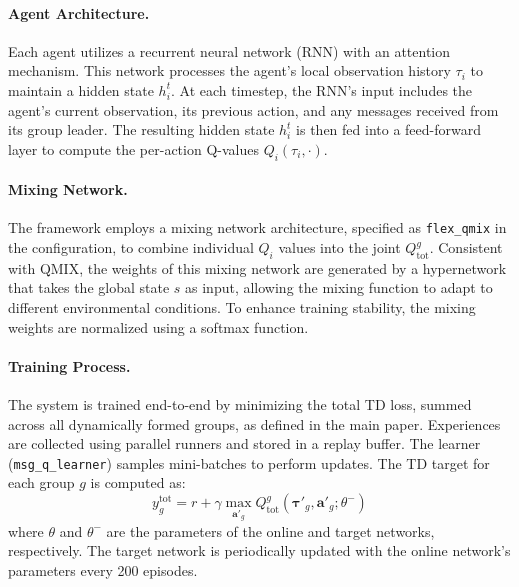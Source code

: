 \paragraph{Agent Architecture.} Each agent utilizes a recurrent neural network (RNN) with an attention mechanism. This network processes the agent's local observation history $\tau_i$ to maintain a hidden state $h_i^t$. At each timestep, the RNN's input includes the agent's current observation, its previous action, and any messages received from its group leader. The resulting hidden state $h_i^t$ is then fed into a feed-forward layer to compute the per-action Q-values $Q_i(\tau_i, \cdot)$.

\paragraph{Mixing Network.} The framework employs a mixing network architecture, specified as \texttt{flex\_qmix} in the configuration, to combine individual $Q_i$ values into the joint $Q_{\text{tot}}^g$. Consistent with QMIX, the weights of this mixing network are generated by a hypernetwork that takes the global state $s$ as input, allowing the mixing function to adapt to different environmental conditions. To enhance training stability, the mixing weights are normalized using a softmax function.

\paragraph{Training Process.} The system is trained end-to-end by minimizing the total TD loss, summed across all dynamically formed groups, as defined in the main paper. Experiences are collected using parallel runners and stored in a replay buffer. The learner (\texttt{msg\_q\_learner}) samples mini-batches to perform updates. The TD target for each group $g$ is computed as:
\[ y_g^{\text{tot}} = r + \gamma \max_{\mathbf{a}'_g} Q_{\text{tot}}^g(\boldsymbol{\tau}'_g, \mathbf{a}'_g; \theta^-) \]
where $\theta$ and $\theta^-$ are the parameters of the online and target networks, respectively. The target network is periodically updated with the online network's parameters every 200 episodes.
